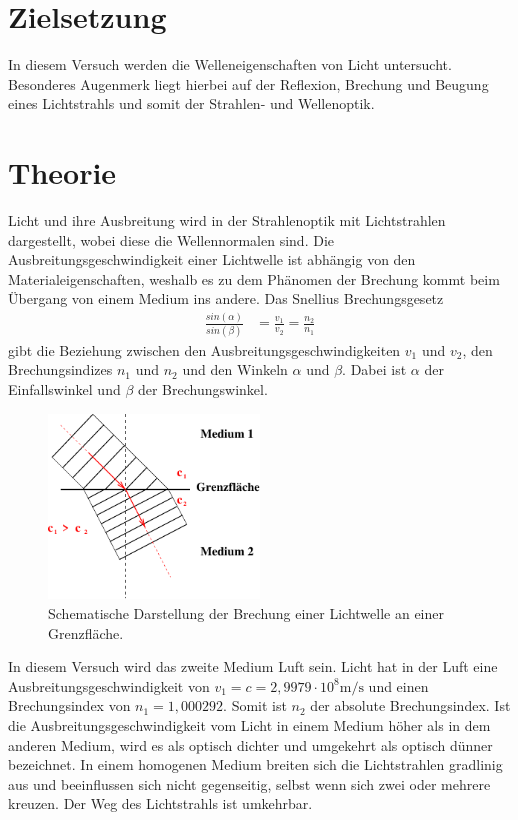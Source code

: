 \section{Zielsetzung}
\label{sec:Zielsetzung}

In diesem Versuch werden die Welleneigenschaften von Licht untersucht. Besonderes Augenmerk liegt hierbei auf der Reflexion, 
Brechung und Beugung eines Lichtstrahls und somit der Strahlen- und Wellenoptik.

\section{Theorie}
\label{sec:Theorie}
Licht und ihre Ausbreitung wird in der Strahlenoptik mit Lichtstrahlen dargestellt, wobei diese die Wellennormalen sind.
Die Ausbreitungsgeschwindigkeit einer Lichtwelle ist abhängig von den Materialeigenschaften, weshalb es zu dem Phänomen der Brechung kommt 
beim Übergang von einem Medium ins andere.
Das Snellius Brechungsgesetz
\begin{align}
    \frac{sin(\alpha)}{sin(\beta)}  &= \frac{v_1}{v_2} = \frac{n_2}{n_1}
    \label{eqn:Brechung}
\end{align}
gibt die Beziehung zwischen den Ausbreitungsgeschwindigkeiten $v_1$ und $v_2$, den Brechungsindizes $n_1$ und $n_2$ und den Winkeln $\alpha$ und $\beta$.
Dabei ist $\alpha$ der Einfallswinkel und $\beta$ der Brechungswinkel.
\begin{figure}[H]
    \centering
    \includegraphics[width=0.5\textwidth]{build/Abb_1.pdf}
    \caption {Schematische Darstellung der Brechung einer Lichtwelle an einer Grenzfläche\cite[1]{V400}.}
    \label{fig:Abb_1}
\end{figure}
In diesem Versuch wird das zweite Medium Luft sein. 
Licht hat in der Luft eine Ausbreitungsgeschwindigkeit von $v_1 = c = 2,9979 \cdot 10^8 \si{\meter\per\second}$ und einen Brechungsindex von $n_1 = 1,000292$.
Somit ist $n_2$ der absolute Brechungsindex.
Ist die Ausbreitungsgeschwindigkeit vom Licht in einem Medium höher als in dem anderen Medium, 
wird es als optisch dichter und umgekehrt als optisch dünner bezeichnet.
In einem homogenen Medium breiten sich die Lichtstrahlen gradlinig aus und beeinflussen sich nicht gegenseitig, selbst wenn sich zwei oder mehrere kreuzen.
Der Weg des Lichtstrahls ist umkehrbar.


